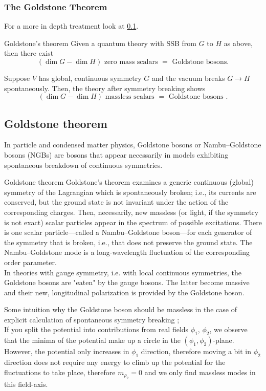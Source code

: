 \subsubsection{The Goldstone Theorem}
For a more in depth treatment look at \ref{subsec:goldstone}.\\
\begin{mybox}{Goldstone's theorem}
	Given a quantum theory with SSB from $G$ to $H$ as above, then there exist 
	\begin{equation*}
		(\dim G-\dim H) \text{ zero mass scalars } = \text{ Goldstone bosons}.
	\end{equation*}
\end{mybox}
Suppose $V$ has global, continuous symmetry $G$ and the vacuum breaks $G\rightarrow H$ spontaneously. Then, the theory after symmetry breaking shows
\begin{equation*}
	(\dim G-\dim H) \text{ massless scalars } = \text{ Goldstone bosons }.
\end{equation*}
\subsection{Goldstone theorem}
\label{subsec:goldstone}
In particle and condensed matter physics, Goldstone bosons or Nambu–Goldstone bosons (NGBs) are bosons that appear necessarily in models exhibiting spontaneous breakdown of continuous symmetries.
\begin{mybox}{Goldstone theorem}
	Goldstone's theorem examines a generic continuous (global) symmetry of the Lagrangian which is spontaneously broken; i.e., its currents are conserved, but the ground state is not invariant under the action of the corresponding charges. Then, necessarily, new massless (or light, if the symmetry is not exact) scalar particles appear in the spectrum of possible excitations. There is one scalar particle—called a Nambu–Goldstone boson—for each generator of the symmetry that is broken, i.e., that does not preserve the ground state. The Nambu–Goldstone mode is a long-wavelength fluctuation of the corresponding order parameter.\\
	In theories with gauge symmetry, i.e. with local continuous symmetries, the Goldstone bosons are "eaten" by the gauge bosons. The latter become massive and their new, longitudinal polarization is provided by the Goldstone boson.
\end{mybox}
Some intuition why the Goldstone boson should be massless in the case of explicit calculation of spontaneous symmetry breaking ;\\
If you split the potential into contributions from real fields $\phi_1$, $\phi_2$, we observe that the minima of the potential make up a circle in the $(\phi_1,\phi_2)$-plane. However, the potential only increases in $\phi_1$ direction, therefore moving a bit in $\phi_2$ direction does not require any energy to climb up the potential for the fluctuations to take place, therefore $m_{\rho_2}=0$ and we only find massless modes in this field-axis.\\

